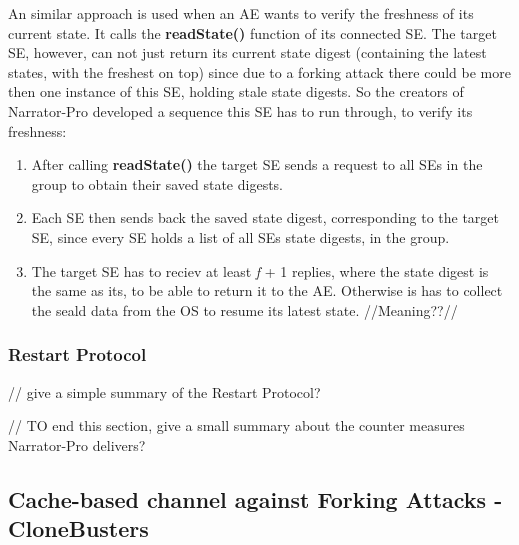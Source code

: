 An similar approach is used when an AE wants to verify the freshness of its current state. It calls the \textbf{readState()} function of its connected SE. The target SE, however, can not just return its current state digest (containing the latest states, with the freshest on top)
since due to a forking attack there could be more then one instance of this SE, holding stale state digests. So the creators of Narrator-Pro developed a sequence this SE has to run through, to verify its freshness:
\begin{enumerate}
    \item After calling \textbf{readState()} the target SE sends a request to all SEs in the group to obtain their saved state digests.
    \item Each SE then sends back the saved state digest, corresponding to the target SE, since every SE holds a list of all SEs state digests, in the group.
    \item The target SE has to reciev at least \textit{f} + 1 replies, where the state digest is the same as its, to be able to return it to the AE. Otherwise is has to collect the seald data from the OS to resume its latest state. //Meaning??//
\end{enumerate}


\subsubsection{Restart Protocol}



// give a simple summary of the Restart Protocol?


// TO end this section, give a small summary about the counter measures Narrator-Pro delivers?


\subsection{Cache-based channel against Forking Attacks - CloneBusters}

